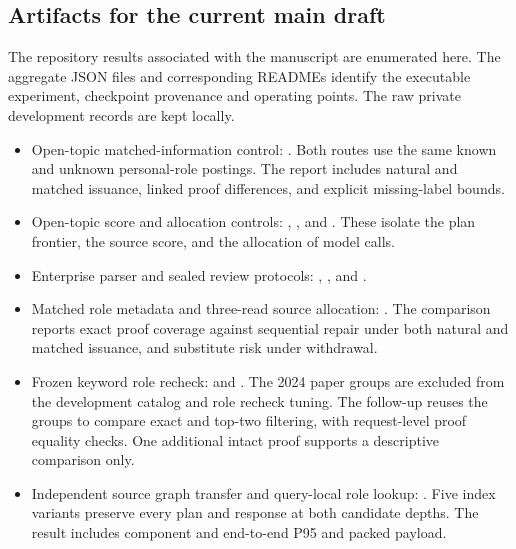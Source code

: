 \subsection{Artifacts for the current main draft}
The repository results associated with the manuscript are enumerated here. The aggregate JSON files and corresponding READMEs identify the executable experiment, checkpoint provenance and operating points. The raw private development records are kept locally.

\begin{itemize}
\item Open-topic matched-information control: . Both routes use the same known and unknown personal-role postings. The report includes natural and matched issuance, linked proof differences, and explicit missing-label bounds.
\item Open-topic score and allocation controls: , , and . These isolate the plan frontier, the source score, and the allocation of model calls.
\item Enterprise parser and sealed review protocols: , , and .
\item Matched role metadata and three-read source allocation: . The comparison reports exact proof coverage against sequential repair under both natural and matched issuance, and substitute risk under withdrawal.
\item Frozen keyword role recheck:  and . The 2024 paper groups are excluded from the development catalog and role recheck tuning. The follow-up  reuses the groups to compare exact and top-two filtering, with request-level proof equality checks. One additional intact proof supports a descriptive comparison only.
\item Independent source graph transfer and query-local role lookup: . Five index variants preserve every plan and response at both candidate depths. The result includes component and end-to-end P95 and packed payload.

\end{itemize}
